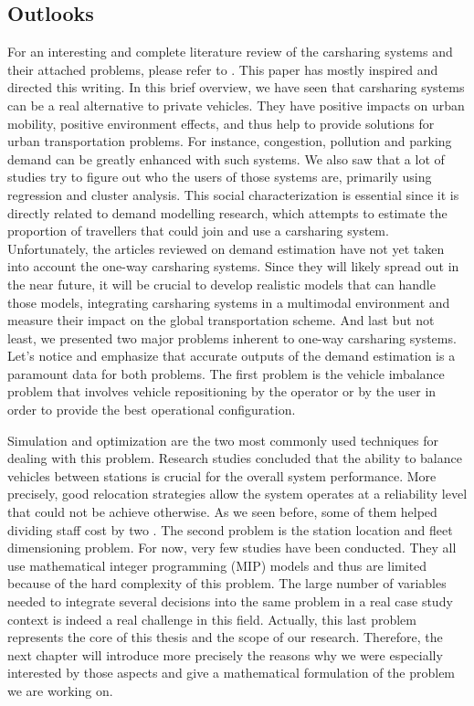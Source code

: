 \begin{bibunit}[ieeetr]
\subsection{Outlooks}

For an interesting and complete literature review of the carsharing systems and their attached problems, please refer to \cite{jorge_carsharing_2013}.
This paper has mostly inspired and directed this writing.
In this brief overview, we have seen that carsharing systems can be a real alternative to private vehicles.
They have positive impacts on urban mobility, positive environment effects, and thus help to provide solutions for urban transportation problems.
For instance, congestion, pollution and parking demand can be greatly enhanced with such systems.
We also saw that a lot of studies try to figure out who the users of those systems are, primarily
using regression and cluster analysis.
This social characterization is essential since it is directly related to demand modelling research, which attempts to estimate the proportion of
travellers that could join and use a carsharing system.
Unfortunately, the articles reviewed on demand estimation have not yet taken into account the one-way carsharing systems.
Since they will likely spread out in the near future, it will be crucial to develop realistic models that can handle those models, integrating carsharing systems in a multimodal environment and measure their impact on the global transportation scheme.
And last but not least, we presented two major problems inherent to one-way carsharing systems.
Let's notice and emphasize that accurate outputs of the demand estimation is a paramount data for both problems.
The first problem is the vehicle imbalance problem that involves vehicle repositioning by the operator or by the user in order to provide the best operational configuration.

Simulation and optimization are the two most commonly used techniques for dealing with this problem.
Research studies concluded that the ability to balance vehicles between stations is crucial for the overall system performance.
More precisely, good relocation strategies allow the system operates at a reliability level that could not be achieve otherwise.
As we seen before, some of them helped dividing staff cost by two \cite{kek_decision_2009}.
The second problem is the station location and  fleet dimensioning problem.
For now, very few studies have been conducted.
They all use mathematical integer programming (MIP) models and thus are limited because of the hard complexity of this problem.
The large number of variables needed to integrate several decisions into the same problem in a real case study context is indeed a real challenge in this field.
Actually, this last problem represents the core of this thesis and the scope of our research.
Therefore, the next chapter will introduce more precisely the reasons why we were especially interested by those aspects and give a mathematical formulation of the problem we are working on.



\end{bibunit}
